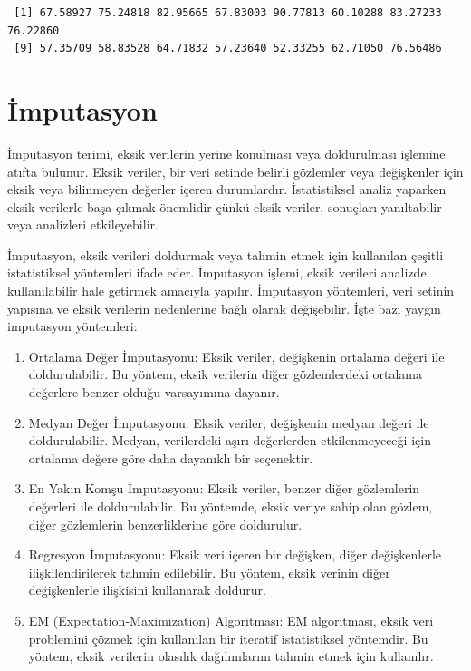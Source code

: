 \documentclass[
  letterpaper,
  DIV=11,
  numbers=noendperiod]{scrreprt}
\begin{document}
\begin{verbatim}
 [1] 67.58927 75.24818 82.95665 67.83003 90.77813 60.10288 83.27233 76.22860
 [9] 57.35709 58.83528 64.71832 57.23640 52.33255 62.71050 76.56486
\end{verbatim}

\hypertarget{imputasyon}{%
\section*{İmputasyon}\label{imputasyon}}


İmputasyon terimi, eksik verilerin yerine konulması veya doldurulması
işlemine atıfta bulunur. Eksik veriler, bir veri setinde belirli
gözlemler veya değişkenler için eksik veya bilinmeyen değerler içeren
durumlardır. İstatistiksel analiz yaparken eksik verilerle başa çıkmak
önemlidir çünkü eksik veriler, sonuçları yanıltabilir veya analizleri
etkileyebilir.

İmputasyon, eksik verileri doldurmak veya tahmin etmek için kullanılan
çeşitli istatistiksel yöntemleri ifade eder. İmputasyon işlemi, eksik
verileri analizde kullanılabilir hale getirmek amacıyla yapılır.
İmputasyon yöntemleri, veri setinin yapısına ve eksik verilerin
nedenlerine bağlı olarak değişebilir. İşte bazı yaygın imputasyon
yöntemleri:

\begin{enumerate}
\def\labelenumi{\arabic{enumi}.}
\item
  Ortalama Değer İmputasyonu: Eksik veriler, değişkenin ortalama değeri
  ile doldurulabilir. Bu yöntem, eksik verilerin diğer gözlemlerdeki
  ortalama değerlere benzer olduğu varsayımına dayanır.
\item
  Medyan Değer İmputasyonu: Eksik veriler, değişkenin medyan değeri ile
  doldurulabilir. Medyan, verilerdeki aşırı değerlerden etkilenmeyeceği
  için ortalama değere göre daha dayanıklı bir seçenektir.
\item
  En Yakın Komşu İmputasyonu: Eksik veriler, benzer diğer gözlemlerin
  değerleri ile doldurulabilir. Bu yöntemde, eksik veriye sahip olan
  gözlem, diğer gözlemlerin benzerliklerine göre doldurulur.
\item
  Regresyon İmputasyonu: Eksik veri içeren bir değişken, diğer
  değişkenlerle ilişkilendirilerek tahmin edilebilir. Bu yöntem, eksik
  verinin diğer değişkenlerle ilişkisini kullanarak doldurur.
\item
  EM (Expectation-Maximization) Algoritması: EM algoritması, eksik veri
  problemini çözmek için kullanılan bir iteratif istatistiksel
  yöntemdir. Bu yöntem, eksik verilerin olasılık dağılımlarını tahmin
  etmek için kullanılır.
\end{enumerate}
\end{document}
